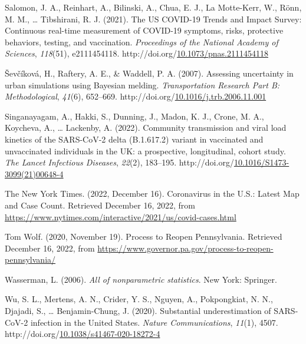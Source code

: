 \documentclass[12pt,twoside]{smiththesis}
\newlength{\cslhangindent}
\newenvironment{CSLReferences}[2] %
 {%
\setlength{\parindent}{0pt}
\ifodd #1 \everypar{\setlength{\hangindent}{\cslhangindent}}\ignorespaces\fi
\ifnum #2 > 0
\setlength{\parskip}{#2\baselineskip}
  \fi
}%
{}
\begin{document}
\begin{CSLReferences}{1}{0}
\leavevmode{}%
Salomon, J. A., Reinhart, A., Bilinski, A., Chua, E. J., La Motte-Kerr, W., Rönn, M. M., \ldots{} Tibshirani, R. J. (2021). The US COVID-19 Trends and Impact Survey: Continuous real-time measurement of COVID-19 symptoms, risks, protective behaviors, testing, and vaccination. \emph{Proceedings of the National Academy of Sciences}, \emph{118}(51), e2111454118. http://doi.org/\href{https://doi.org/10.1073/pnas.2111454118}{10.1073/pnas.2111454118}

\leavevmode{}%
Ševčíková, H., Raftery, A. E., \& Waddell, P. A. (2007). Assessing uncertainty in urban simulations using Bayesian melding. \emph{Transportation Research Part B: Methodological}, \emph{41}(6), 652--669. http://doi.org/\href{https://doi.org/10.1016/j.trb.2006.11.001}{10.1016/j.trb.2006.11.001}

\leavevmode{}%
Singanayagam, A., Hakki, S., Dunning, J., Madon, K. J., Crone, M. A., Koycheva, A., \ldots{} Lackenby, A. (2022). Community transmission and viral load kinetics of the SARS-CoV-2 delta (B.1.617.2) variant in vaccinated and unvaccinated individuals in the UK: a prospective, longitudinal, cohort study. \emph{The Lancet Infectious Diseases}, \emph{22}(2), 183--195. http://doi.org/\href{https://doi.org/10.1016/S1473-3099(21)00648-4}{10.1016/S1473-3099(21)00648-4}

\leavevmode{}%
The New York Times. (2022, December 16). Coronavirus in the U.S.: Latest Map and Case Count. Retrieved December 16, 2022, from \url{https://www.nytimes.com/interactive/2021/us/covid-cases.html}

\leavevmode{}%
Tom Wolf. (2020, November 19). Process to Reopen Pennsylvania. Retrieved December 16, 2022, from \url{https://www.governor.pa.gov/process-to-reopen-pennsylvania/}

\leavevmode{}%
Wasserman, L. (2006). \emph{All of nonparametric statistics}. New York: Springer.

\leavevmode{}%
Wu, S. L., Mertens, A. N., Crider, Y. S., Nguyen, A., Pokpongkiat, N. N., Djajadi, S., \ldots{} Benjamin-Chung, J. (2020). Substantial underestimation of SARS-CoV-2 infection in the United States. \emph{Nature Communications}, \emph{11}(1), 4507. http://doi.org/\href{https://doi.org/10.1038/s41467-020-18272-4}{10.1038/s41467-020-18272-4}

\end{CSLReferences}

\end{document}
